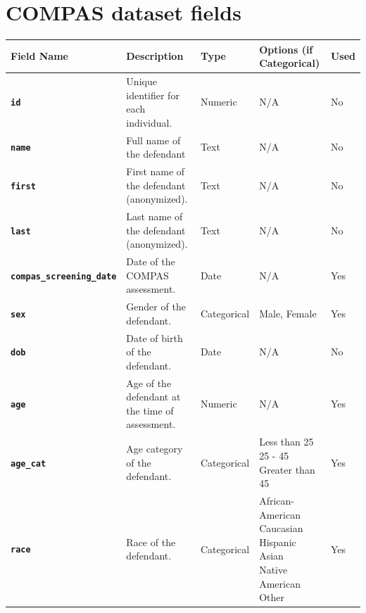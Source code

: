 \documentclass[conference]{IEEEtran}
\begin{document}
	\begin{figure}
		\centering
		
		\caption{}
		\label{fig:pipeline}
	\end{figure}
	
	
	
\printbibliography

\onecolumn
\pagebreak
\appendix 
\section{COMPAS dataset fields}

	\begin{table}[!ht]
	\centering
	\begin{tabular}{|l|l|l|l|l|}
		\hline
		Field Name	&	Description	&	Type	&	Options (if Categorical)	&	Used \\ \hline\hline
		\textbf{\texttt{id}}	&	Unique identifier for each individual.	&	Numeric	&	N/A	&	No \\ \hline
		\textbf{\texttt{name}}	&	Full name of the defendant	&	Text	&	N/A	&	No \\ \hline
		\textbf{\texttt{first}}	&	First name of the defendant (anonymized).	&	Text	&	N/A	&	No \\ \hline
		\textbf{\texttt{last}}	&	Last name of the defendant (anonymized).	&	Text	&	N/A	&	No \\ \hline
		\textbf{\texttt{compas\_screening\_date}}	&	Date of the COMPAS assessment.	&	Date	&	N/A	&	Yes \\ \hline
		\textbf{\texttt{sex}}	&	Gender of the defendant.	&	Categorical	&	Male, Female	&	Yes \\ \hline
		\textbf{\texttt{dob}}	&	Date of birth of the defendant.	&	Date	&	N/A	&	No \\ \hline
		\textbf{\texttt{age}}	&	Age of the defendant at the time of assessment.	&	Numeric	&	N/A	&	Yes \\ \hline
		\textbf{\texttt{age\_cat}}	&	Age category of the defendant.	&	Categorical	&	\makecell[l]{Less than 25\\25 - 45\\Greater than 45}	&	Yes \\ \hline
		\textbf{\texttt{race}}	&	Race of the defendant.	&	Categorical	&	\makecell[l]{African-American\\Caucasian\\Hispanic\\Asian\\Native American\\Other}	&	Yes \\ \hline

\end{tabular}
\end{table}
\end{document}

